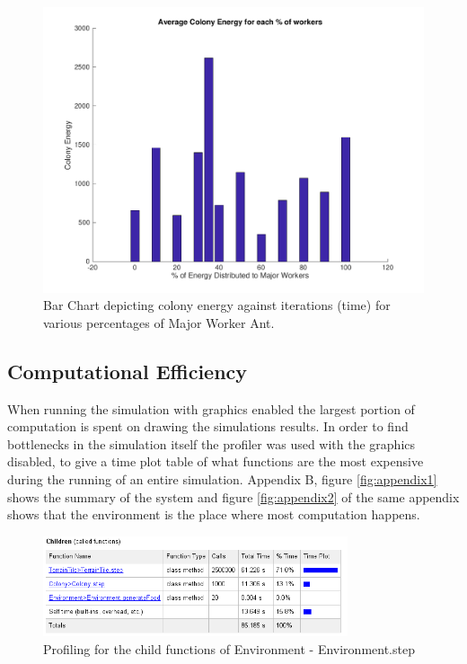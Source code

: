 \begin{figure}[H]
  \centering
  \includegraphics[width=1\textwidth]{images/bar-chart-results.png}
  \caption{Bar Chart depicting colony energy against iterations (time) for various percentages of Major Worker Ant.}
  \label{fig:iters-bar}
\end{figure}


\subsection{Computational Efficiency}

When running the simulation with graphics enabled the largest portion of computation is spent on drawing the simulations results. In order to find bottlenecks in the simulation itself the profiler was used with the graphics disabled, to give a time plot table of what functions are the most expensive during the running of an entire simulation. Appendix B, figure \ref{fig:appendix1} shows the summary of the system and figure \ref{fig:appendix2} of the same appendix shows that the environment is the place where most computation happens.\par

 \begin{figure}[htb]
  \centering
  \includegraphics[width=0.8\textwidth]{images/text1.png}
  \caption{Profiling for the child functions of Environment - Environment.step}
  \label{fig:text1}
\end{figure}

